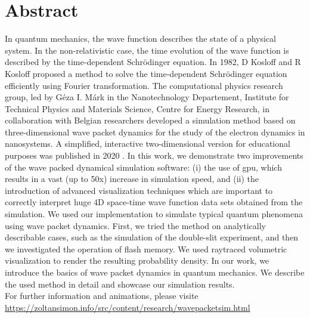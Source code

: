 \section*{Abstract}

In quantum mechanics, the wave function describes the state of a physical system. In the non-relativistic case, the time evolution of the wave function is described by the time-dependent Schrö\-din\-ger equation. In 1982, D Kosloff and R Kosloff proposed a method \cite{KOSLOFF198335} to solve the time-dependent Schrödinger equation efficiently using Fourier transformation.
The computational physics research group, led by Géza I. Márk in the
Nanotechnology Departement, Institute for Technical Physics and
Materials Science, Centre for Energy Research, in collaboration with
Belgian researchers developed a simulation method based on
three-dimensional wave packet dynamics for the study of the electron
dynamics in nanosystems. A simplified, interactive two-dimensional
version for educational purposes was published in 2020 \cite{mark2020webschrodinger}. In this
work, we demonstrate two improvements of the wave packed dynamical
simulation software: (i) the use of \acrfull{gpu},
which results in a vast (up to 50x) increase in simulation speed, and (ii)
the introduction of advanced visualization techniques \cite{raytracing_weekend, csebfalvi2023} which
are important to correctly interpret huge 4D space-time wave function
data sets obtained from the simulation.
We used our implementation to simulate typical quantum phenomena using wave packet dynamics. First, we tried the method on analytically describable cases, such as the simulation of the double-slit experiment, and then we investigated the operation of flash memory. We used raytraced volumetric visualization to render the resulting probability density. In our work, we introduce the basics of wave packet dynamics in quantum mechanics. We describe the used method in detail and showcase our simulation results.\\
For further information and animations, please visite\\ \url{https://zoltansimon.info/src/content/research/wavepacketsim.html}

